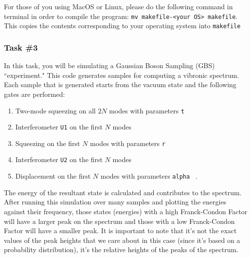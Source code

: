 \documentclass[12pt]{article}
\begin{document}
For those of you using MacOS or Linux, please do the following command in terminal in order to compile the program: \texttt{mv makefile-<your OS> makefile}. This copies the contents corresponding to your operating system into \texttt{makefile}

\subsubsection*{Task \#3}
In this task, you will be simulating a Gaussian Boson Sampling (GBS) ``experiment." This code generates samples for computing a vibronic spectrum. Each sample that is generated starts from the vacuum state and the following gates are performed\cite{killoran2019strawberry, bromley2020applications}:
\begin{enumerate}
\item Two-mode squeezing on all  $2N$  modes with parameters \texttt{t}
\item Interferometer \texttt{U1} on the first $ N$ modes
\item Squeezing on the first $N$ modes with parameters \texttt{r}
\item Interferometer \texttt{U2} on the first  $N$ modes
\item Displacement on the first  $N$ modes with parameters \texttt{alpha} ~.
\end{enumerate}

The energy of the resultant state is calculated and contributes to the spectrum. After running this simulation over many samples and plotting the energies against their frequency, those states (energies) with a high Franck-Condon Factor will have a larger peak on the spectrum and those with a low Franck-Condon Factor will have a smaller peak. It is important to note that it's not the exact values of the peak heights that we care about in this case (since it's based on a probability distribution), it's the relative heights of the peaks of the spectrum.


\hspace{20mm}
\end{document}
